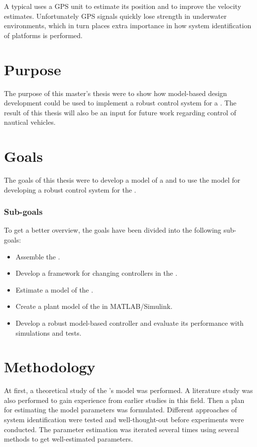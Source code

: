 A typical \abbrUV uses a GPS unit to estimate its position and to improve the velocity estimates. Unfortunately GPS signals quickly lose strength in underwater environments, which in turn places extra importance in how system identification of \abbrROV platforms is performed.


\section{Purpose}
The purpose of this master's thesis were to show how model-based design development could be used to implement a robust control system for a \abbrROV. The result of this thesis will also be an input for future work regarding control of nautical vehicles. 


\section{Goals}
The goals of this thesis were to develop a model of a \abbrROV and to use the model for developing a robust control system for the \abbrROV.

\subsubsection{Sub-goals}
To get a better overview, the goals have been divided into the following sub-goals:
\begin{itemize}
    \item Assemble the \abbrROV.
    \item Develop a framework for changing controllers in the \abbrROV.
    \item Estimate a model of the \abbrROV.
    \item Create a plant model of the \abbrROV in MATLAB/Simulink.
    \item Develop a robust model-based controller and evaluate its performance with simulations and tests.
\end{itemize}

\section{Methodology}
At first, a theoretical study of the \abbrROV's model was performed. A literature study was also performed to gain experience from earlier studies in this field. Then a plan for estimating the model parameters was formulated. Different approaches of system identification were tested and well-thought-out before experiments were conducted. The parameter estimation was iterated several times using several methods to get well-estimated parameters. 

